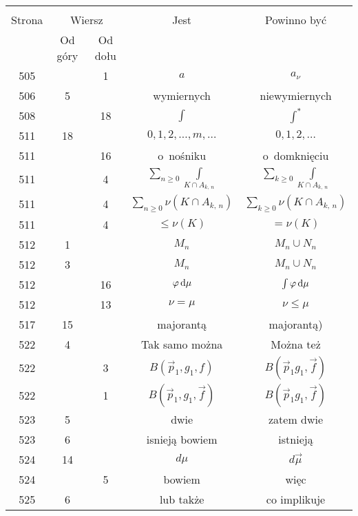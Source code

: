 \documentclass[a4paper,11pt]{article}
\begin{document}
\begin{center}

  \begin{tabular}{|c|c|c|c|c|}
    \hline
    & \multicolumn{2}{c|}{} & & \\
    Strona & \multicolumn{2}{c|}{Wiersz} & Jest
                              & Powinno być \\ \cline{2-3}
    & Od góry & Od dołu & & \\
    \hline
    505 & &  1 & $a$ & $a_{ \nu }$ \\
    506 &  5 & & wymiernych & niewymiernych \\
    508 & & 18 & $\int$ & $\int^{ * }$ \\
    511 & 18 & & $0, 1, 2, \ldots, m, \ldots$ & $0, 1, 2, \ldots$ \\
    511 & & 16 & o~nośniku & o~domknięciu \\
    511 & &  4 & $\sum\limits_{ n \geq 0 } \int\limits_{ K \cap A_{ k,\, n } }$
           & $\sum\limits_{ k \geq 0 } \int\limits_{ K \cap A_{ k,\, n } }$ \\
    511 & &  4 & $\sum\limits_{ n \geq 0 } \nu( K \cap A_{ k,\, n } )$
           & $\sum\limits_{ k \geq 0 } \nu( K \cap A_{ k,\, n } )$ \\
    511 & &  4 & $\leq \nu( K )$ & $= \nu( K )$ \\
    512 &  1 & & $M_{ n }$ & $M_{ n } \cup N_{ n }$ \\
    512 &  3 & & $M_{ n }$ & $M_{ n } \cup N_{ n }$ \\
    512 & & 16 & $\varphi\, \mathrm{d} \mu$ & $\int \varphi\, \mathrm{d} \mu$ \\
    512 & & 13 & $\nu = \mu$ & $\nu \leq \mu$ \\
    517 & 15 & & majorantą & majorantą) \\
    522 &  4 & & Tak samo można & Można też \\
    522 & &  3 & $B( \vec{ p }_{ 1 }, g_{ 1 }, f )$
           & $B( \vec{ p }_{ 1 } g_{ 1 }, \vec{ f } )$ \\
    522 & &  1 & $B( \vec{ p }_{ 1 }, g_{ 1 }, \vec{ f } )$
           & $B( \vec{ p }_{ 1 } g_{ 1 }, \vec{ f } )$ \\
    523 &  5 & & dwie & zatem dwie \\
    523 &  6 & & isnieją bowiem & istnieją \\
    524 & 14 & & $d \mu$ & $d \vec{ \mu }$ \\
    524 & &  5 & bowiem & więc \\
    525 &  6 & & lub także & co implikuje \\

\end{tabular}
\end{center}
\end{document}
